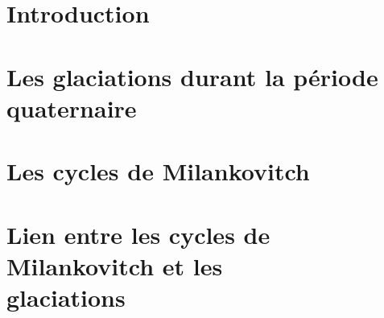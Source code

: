 \documentclass[openany,a4paper,12pt]{article}
\begin{document}
	
	
%	
%
%	

\tableofcontents
\newpage


\section{Introduction}




\section{Les glaciations durant la période quaternaire}




\section{Les cycles de Milankovitch}




\section{Lien entre les cycles de Milankovitch et les \\glaciations}
\end{document}
